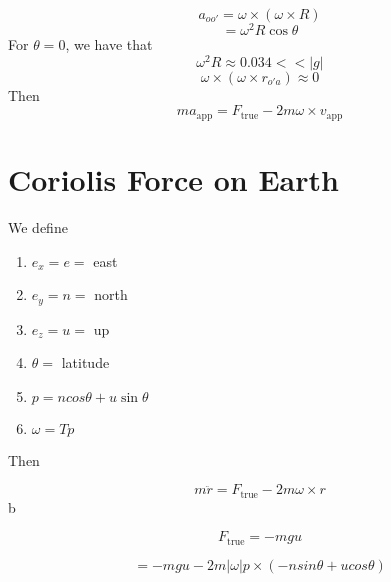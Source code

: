\documentclass{article}
\newtheorem{one minute paper}[theorem]{One Minute Paper}
\begin{document}
\begin{equation}
    a_{oo'} = \omega \times (\omega \times R)
\end{equation}
\begin{equation}
    = \omega^2 R \cos\theta 
\end{equation}
For $\theta = 0$, we have that 
\begin{equation}
    \omega^2 R \approx 0.034 << |g|
\end{equation}
\begin{equation}
    \omega \times (\omega \times r_{o'a}) \approx 0
\end{equation}
Then 
\begin{equation}
    ma_{\text{app}} = F_{\text{true}} - 2m\omega \times v_{\text{app}}
\end{equation}

\section*{Coriolis Force on Earth}

We define 
\begin{enumerate}
    \item $e_x = e = $ east
    \item $e_y = n = $ north 
    \item $e_z = u = $ up 
    \item $\theta = $ latitude
    \item $p = ncos\theta + u\sin\theta$
    \item $\omega = Tp$
\end{enumerate}

Then 

\begin{equation}
    m\ddot{r} = F_{\text{true}} - 2m\omega \times r
\end{equation}b

\begin{equation}
    F_{\text{true}} = -mgu 
\end{equation}

\begin{equation}
    = -mgu - 2m|\omega|p \times (-nsin\theta + ucos\theta)
\end{equation}
\end{document}
